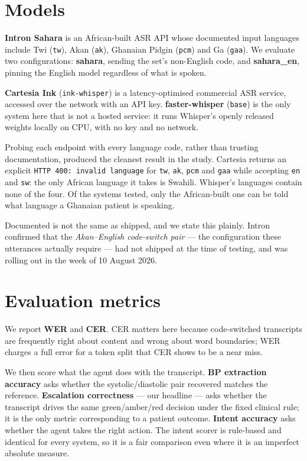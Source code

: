 \documentclass[a4paper,10pt,twocolumn]{article}
\begin{document}
\section{Models}

\textbf{Intron Sahara} is an African-built ASR API whose documented input
languages include Twi (\texttt{tw}), Akan (\texttt{ak}), Ghanaian Pidgin
(\texttt{pcm}) and Ga (\texttt{gaa}). We evaluate two configurations:
\textbf{sahara}, sending the set's non-English code, and \textbf{sahara\_en},
pinning the English model regardless of what is spoken.

\textbf{Cartesia Ink} (\texttt{ink-whisper}) is a latency-optimised commercial
ASR service, accessed over the network with an API key. \textbf{faster-whisper}
(\texttt{base}) is the only system here that is not a hosted service: it runs
Whisper's openly released weights locally on CPU, with no key and no network.

Probing each endpoint with every language code, rather than trusting
documentation, produced the cleanest result in the study. Cartesia returns an
explicit \texttt{HTTP 400: invalid language} for \texttt{tw}, \texttt{ak},
\texttt{pcm} and \texttt{gaa} while accepting \texttt{en} and \texttt{sw}: the
only African language it takes is Swahili. Whisper's languages contain none of
the four. Of the systems tested, only the African-built one can be told what
language a Ghanaian patient is speaking.

Documented is not the same as shipped, and we state this plainly. Intron
confirmed that the \emph{Akan--English code-switch pair} --- the configuration
these utterances actually require --- had not shipped at the time of testing, and
was rolling out in the week of 10 August 2026.

\section{Evaluation metrics}

We report \textbf{WER} and \textbf{CER}. CER matters here because code-switched
transcripts are frequently right about content and wrong about word boundaries;
WER charges a full error for a token split that CER shows to be a near miss.

We then score what the agent does with the transcript. \textbf{BP extraction
accuracy} asks whether the systolic/diastolic pair recovered matches the
reference. \textbf{Escalation correctness} --- our headline --- asks whether the
transcript drives the same green/amber/red decision under the fixed clinical
rule; it is the only metric corresponding to a patient outcome. \textbf{Intent
accuracy} asks whether the agent takes the right action. The intent scorer is
rule-based and identical for every system, so it is a fair comparison even where
it is an imperfect absolute measure.
\end{document}
